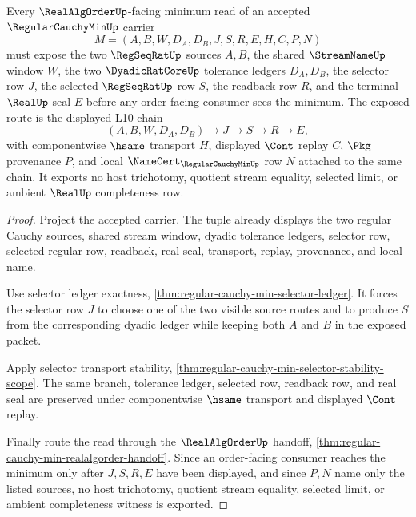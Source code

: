 \begin{theorem}
\label{thm:regular-cauchy-min-dyadic-order-scope}
Every $\RealAlgOrderUp$-facing minimum read of an accepted $\RegularCauchyMinUp$ carrier
$$
M=(A,B,W,D_A,D_B,J,S,R,E,H,C,P,N)
$$
must expose the two $\RegSeqRatUp$ sources $A,B$, the shared $\StreamNameUp$ window $W$, the two $\DyadicRatCoreUp$ tolerance ledgers $D_A,D_B$, the selector row $J$, the selected $\RegSeqRatUp$ row $S$, the readback row $R$, and the terminal $\RealUp$ seal $E$ before any order-facing consumer sees the minimum. The exposed route is the displayed L10 chain
$$
(A,B,W,D_A,D_B)
\longrightarrow
J
\longrightarrow
S
\longrightarrow
R
\longrightarrow
E ,
$$
with componentwise $\hsame$ transport $H$, displayed $\Cont$ replay $C$, $\Pkg$ provenance $P$, and local $\NameCert_{\RegularCauchyMinUp}$ row $N$ attached to the same chain. It exports no host trichotomy, quotient stream equality, selected limit, or ambient $\RealUp$ completeness row.
\end{theorem}
\begin{proof}
Project the accepted carrier. The tuple already displays the two regular Cauchy sources, shared stream window, dyadic tolerance ledgers, selector row, selected regular row, readback, real seal, transport, replay, provenance, and local name.

Use selector ledger exactness, \autoref{thm:regular-cauchy-min-selector-ledger}. It forces the selector row $J$ to choose one of the two visible source routes and to produce $S$ from the corresponding dyadic ledger while keeping both $A$ and $B$ in the exposed packet.

Apply selector transport stability, \autoref{thm:regular-cauchy-min-selector-stability-scope}. The same branch, tolerance ledger, selected row, readback row, and real seal are preserved under componentwise $\hsame$ transport and displayed $\Cont$ replay.

Finally route the read through the $\RealAlgOrderUp$ handoff, \autoref{thm:regular-cauchy-min-realalgorder-handoff}. Since an order-facing consumer reaches the minimum only after $J,S,R,E$ have been displayed, and since $P,N$ name only the listed sources, no host trichotomy, quotient stream equality, selected limit, or ambient completeness witness is exported.
\end{proof}

